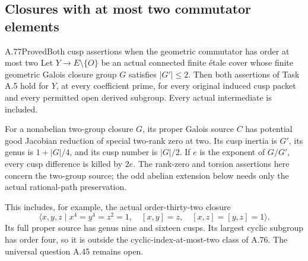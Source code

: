 \subsection{Closures with at most two commutator elements}

\begin{statement}{A.77}{Proved}{Both cusp assertions when the geometric commutator has order at most two}
Let \(Y\to E\setminus\{O\}\) be an actual connected finite
\'{e}tale cover whose finite geometric Galois closure group
\(G\) satisfies \(|G'|\le2\). Then both assertions of
Task A.5 hold for \(Y\), at every coefficient prime,
for every original induced cusp packet and every permitted
open derived subgroup. Every actual intermediate is included.

For a nonabelian two-group closure \(G\), its proper
Galois source \(C\) has potential good Jacobian reduction
of special two-rank zero at two. Its cusp inertia is
\(G'\), its genus is \(1+|G|/4\), and its cusp
number is \(|G|/2\). If \(e\) is the exponent of
\(G/G'\), every cusp difference is killed by \(2e\).
The rank-zero and torsion assertions here concern the
two-group source; the odd abelian extension below needs
only the actual rational-path preservation.

This includes, for example, the actual order-thirty-two
closure
\[
 \langle x,y,z\mid x^4=y^4=z^2=1,\quad
             [x,y]=z,\quad [x,z]=[y,z]=1\rangle.       \tag{A.77.1}
\]
Its full proper source has genus nine and sixteen cusps.
Its largest cyclic subgroup has order four, so it is
outside the cyclic-index-at-most-two class of A.76.
The universal question A.45 remains open.
\end{statement}

